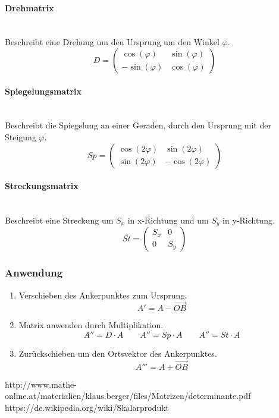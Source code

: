 \documentclass{school}
\begin{document}
\newpage
\paragraph{Drehmatrix}~\\
Beschreibt eine Drehung um den Ursprung um den Winkel $\varphi$.
$$
D = \begin{pmatrix}
\cos(\varphi) & \sin(\varphi)\\
-\sin(\varphi) & \cos(\varphi)
\end{pmatrix}
$$

\paragraph{Spiegelungsmatrix}~\\
Beschreibt die Spiegelung an einer Geraden, durch den Ursprung mit der Steigung $\varphi$.
$$
Sp = \begin{pmatrix}
\cos(2\varphi) & \sin(2\varphi)\\
\sin(2\varphi) & -\cos(2\varphi)
\end{pmatrix}
$$
\paragraph{Streckungsmatrix}~\\
Beschreibt eine Streckung um $S_x$ in x-Richtung und um $S_y$ in y-Richtung.
$$
St = \begin{pmatrix}
S_x & 0\\
0 & S_y
\end{pmatrix}
$$

\subsubsection{Anwendung}
\begin{enumerate}
    \item Verschieben des Ankerpunktes zum Ursprung. $$A' = A - \overrightarrow{OB}$$
    \item Matrix anwenden durch Multiplikation. $$A'' = D \cdot A \quad \quad A'' = Sp \cdot A \quad \quad A'' = St \cdot A$$
    \item Zurückschieben um den Ortsvektor des Ankerpunktes. $$A''' = A + \overrightarrow{OB}$$
\end{enumerate}

\printglossaries{}

\begin{thebibliography}{9}
     http://www.mathe-online.at/materialien/klaus.berger/files/Matrizen/determinante.pdf
     https://de.wikipedia.org/wiki/Skalarprodukt
\end{thebibliography}

\listoffigures
\end{document}
